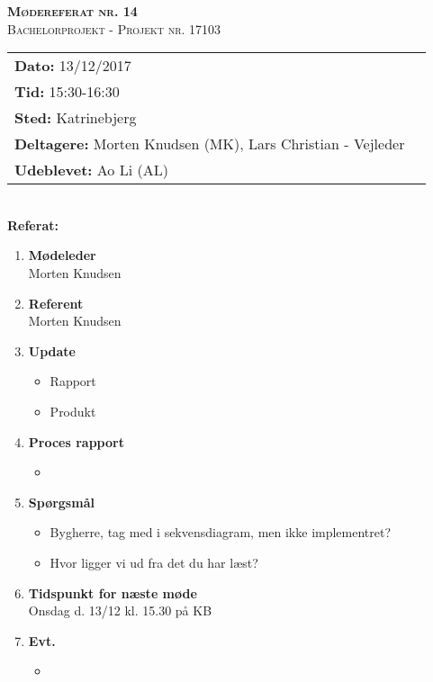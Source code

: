 
\newcommand{\HRule}{\rule{\linewidth}{0.1mm}}


	\begin{center}
		{\huge \bfseries \textsc{Mødereferat nr. 14}}\\
		\textsc{\large Bachelorprojekt - Projekt nr. 17103}\\[0.3cm]
	\end{center}
	\begin{tabular}{ll}
	\large \textbf{Dato:} 13/12/2017  	\\ %
	\large \textbf{Tid:}  15:30-16:30 	\\ %
	\large \textbf{Sted:} Katrinebjerg		\\ %
	\large \textbf{Deltagere:} Morten Knudsen (MK), Lars Christian - Vejleder \\
	\large \textbf{Udeblevet:} Ao Li (AL)
	\end{tabular}\\
	\phantom{\,}\hspace{0.1em} \large \textbf{Referat:}
	\begin{enumerate}
		\itemsep 0.3em 
		\item \textbf{Mødeleder}\\
			Morten Knudsen
		\item \textbf{Referent}\\
			Morten Knudsen

		\item \textbf{Update}
			\begin{itemize}[-]
				\item Rapport 
				\item Produkt
								
			\end{itemize}
		
		\item \textbf{Proces rapport}
		\begin{itemize}[-]
			\item 
		\end{itemize}
			
		\item \textbf{Spørgsmål}
			\begin{itemize}[-]
				\item Bygherre, tag med i sekvensdiagram, men ikke implementret?
				\item Hvor ligger vi ud fra det du har læst?		
			\end{itemize}
	
		\item \textbf{Tidspunkt for næste møde} \\
			Onsdag d. 13/12 kl. 15.30 på KB \\
						
		\item \textbf{Evt.}
			\begin{itemize}[-]
				\item 
			\end{itemize}
			
	\end{enumerate}

